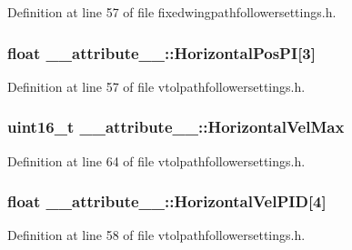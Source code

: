 \-Definition at line 57 of file fixedwingpathfollowersettings.\-h.

\hypertarget{struct____attribute_____aed9f724d8a83f86ca4561859a6be73f5}{
\subsubsection[{\-Horizontal\-Pos\-P\-I}]{\setlength{\rightskip}{0pt plus 5cm}float {\bf \-\_\-\-\_\-attribute\-\_\-\-\_\-\-::\-Horizontal\-Pos\-P\-I}\mbox{[}3\mbox{]}}}\label{struct____attribute_____aed9f724d8a83f86ca4561859a6be73f5}


\-Definition at line 57 of file vtolpathfollowersettings.\-h.

\hypertarget{struct____attribute_____ab3a0201d679bed158db23a5da5b35541}{
\subsubsection[{\-Horizontal\-Vel\-Max}]{\setlength{\rightskip}{0pt plus 5cm}uint16\-\_\-t {\bf \-\_\-\-\_\-attribute\-\_\-\-\_\-\-::\-Horizontal\-Vel\-Max}}}\label{struct____attribute_____ab3a0201d679bed158db23a5da5b35541}


\-Definition at line 64 of file vtolpathfollowersettings.\-h.

\hypertarget{struct____attribute_____a807fbf2b692eb5983404e1c071e155b7}{
\subsubsection[{\-Horizontal\-Vel\-P\-I\-D}]{\setlength{\rightskip}{0pt plus 5cm}float {\bf \-\_\-\-\_\-attribute\-\_\-\-\_\-\-::\-Horizontal\-Vel\-P\-I\-D}\mbox{[}4\mbox{]}}}\label{struct____attribute_____a807fbf2b692eb5983404e1c071e155b7}


\-Definition at line 58 of file vtolpathfollowersettings.\-h.

